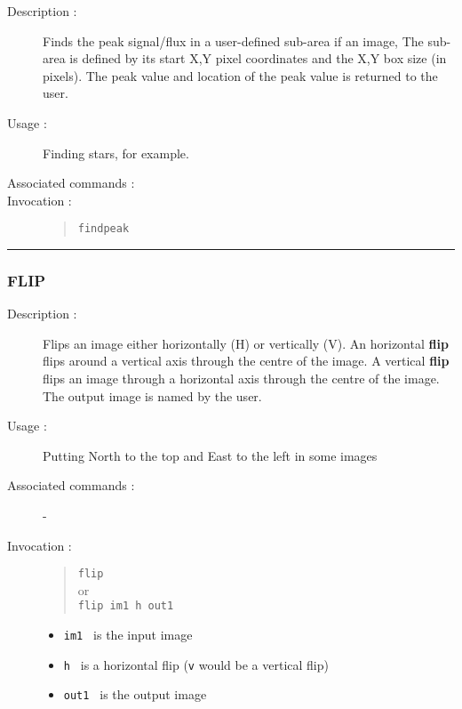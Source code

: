 \begin{description}

\item[Description :] Finds the peak signal/flux in a user-defined
sub-area if an image, The sub-area is defined by its start X,Y pixel
coordinates and the X,Y box size (in pixels).  The peak value and
location of the peak value is returned to the user.

\item[Usage :] Finding stars, for example.

\item[Associated commands :] {\tt {}}

\item[Invocation :]

\begin{quote}{\tt  findpeak }\end{quote}

\end{description}

\hrule
\subsubsection*{\label{FLIP}FLIP}

\begin{description}

\item[Description :] Flips an image either horizontally (H) or
vertically (V). An horizontal {\bf flip} flips around a vertical axis
through the centre of the image.  A vertical {\bf flip} flips an image
through a horizontal axis through the centre of the image.  The output
image is named by the user.

\item[Usage :] Putting North to the top and East to the left in some images
\item[Associated commands :] -
\item[Invocation :]

\begin{quote}{\tt flip} \\
or \\
{\tt flip im1 h out1 }
\end{quote}

\begin{itemize}

\item {\tt im1 } is the input image
\item {\tt h } is a horizontal flip ({\tt v} would be a vertical flip)
\item {\tt out1 } is the output image
\end{itemize}

\end{description}

